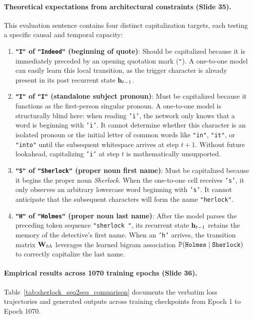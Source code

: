 \documentclass[../../main.tex]{subfiles}
\begin{document}
\paragraph{Theoretical expectations from architectural constraints (Slide 35).}
This evaluation sentence contains four distinct capitalization targets, each testing a specific causal and temporal capacity:
\begin{enumerate}
    \item \textbf{\texttt{"I"} of \texttt{"Indeed"} (beginning of quote)}: Should be capitalized because it is immediately preceded by an opening quotation mark (\texttt{"}). A one-to-one model can easily learn this local transition, as the trigger character is already present in its past recurrent state $\mathbf{h}_{t-1}$.
    \item \textbf{\texttt{"I"} of \texttt{"I"} (standalone subject pronoun)}: Must be capitalized because it functions as the first-person singular pronoun. A one-to-one model is structurally blind here: when reading \texttt{'i'}, the network only knows that a word is beginning with \texttt{'i'}. It cannot determine whether this character is an isolated pronoun or the initial letter of common words like \texttt{"in"}, \texttt{"it"}, or \texttt{"into"} until the subsequent whitespace arrives at step $t+1$. Without future lookahead, capitalizing \texttt{'i'} at step $t$ is mathematically unsupported.
    \item \textbf{\texttt{"S"} of \texttt{"Sherlock"} (proper noun first name)}: Must be capitalized because it begins the proper noun \textit{Sherlock}. When the one-to-one cell receives \texttt{'s'}, it only observes an arbitrary lowercase word beginning with \texttt{'s'}. It cannot anticipate that the subsequent characters will form the name \texttt{"herlock"}.
    \item \textbf{\texttt{"H"} of \texttt{"Holmes"} (proper noun last name)}: After the model parses the preceding token sequence \texttt{"sherlock "}, its recurrent state $\mathbf{h}_{t-1}$ retains the memory of the detective's first name. When an \texttt{'h'} arrives, the transition matrix $\mathbf{W}_{hh}$ leverages the learned bigram association $\mathbb{P}(\text{\texttt{Holmes}} \mid \text{\texttt{Sherlock}})$ to correctly capitalize the last name.
\end{enumerate}

\paragraph{Empirical results across 1070 training epochs (Slide 36).}
Table~\ref{tab:sherlock_seq2seq_comparison} documents the verbatim loss trajectories and generated outputs across training checkpoints from Epoch 1 to Epoch 1070.
\end{document}
